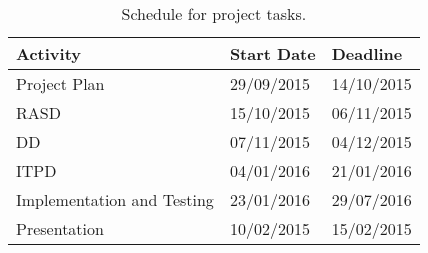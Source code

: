 \begin{table}
    \centering
    \begin{tabular}{| l | l | l |}
        \hline
        \textbf{Activity}   & \textbf{Start Date}   & \textbf{Deadline} \\
		\hline
        Project Plan				& 29/09/2015		& 14/10/2015\\
        \hline
        RASD						& 15/10/2015		& 06/11/2015\\
		\hline
        DD							& 07/11/2015		& 04/12/2015\\
		\hline
        ITPD						& 04/01/2016		& 21/01/2016\\
		\hline
		Implementation and Testing	& 23/01/2016		& 29/07/2016\\
        \hline
        Presentation				& 10/02/2015		& 15/02/2015\\
		\hline
        
    \end{tabular}
    \caption{Schedule for project tasks.}
    \label{tab:schedule}
\end{table}